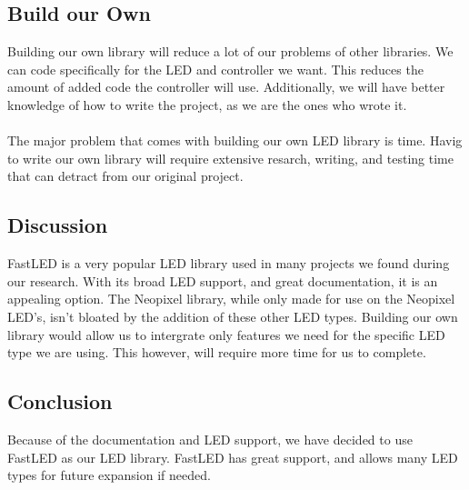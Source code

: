 \documentclass[onecolumn, draftclsnofoot,10pt, compsoc]{IEEEtran}
\begin{document}
		\subsection{Build our Own}
		Building our own library will reduce a lot of our problems of other
		libraries. We can code specifically for the LED and controller we want.
		This reduces the amount of added code the controller will use. Additionally,
		we will have better knowledge of how to write the project, as we are the
		ones who wrote it.
		\\\\
		The major problem that comes with building our own LED library is time.
		Havig to write our own library will require extensive resarch, writing, and
		testing time that can detract from our original project.
		\subsection{Discussion}
		FastLED is a very popular LED library used in many projects we found
		during our research. With its broad LED support, and great documentation,
		it is an appealing option. The Neopixel library, while only made for use on
		the Neopixel LED's, isn't bloated by the addition of these other LED types.
		Building our own library would allow us to intergrate only features we need
		for the specific LED type we are using. This however, will require more
		time for us to complete.
		\subsection{Conclusion}
		Because of the documentation and LED support, we have decided to use
		FastLED as our LED library. FastLED has great support, and allows many LED
		types for future expansion if needed.  


	
\end{document}
